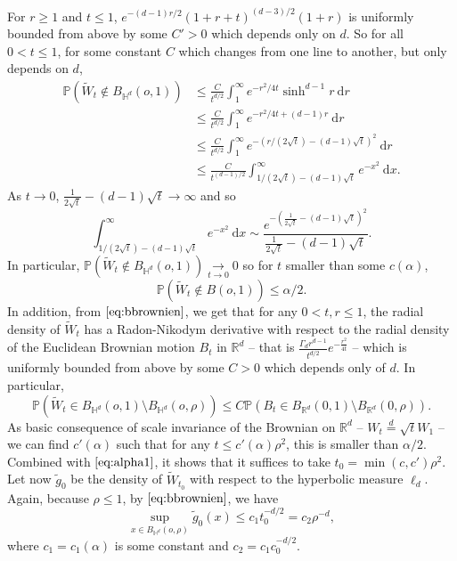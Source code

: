 \documentclass[]{scrartcl}
\newcommand{\dH}{\mathds H}
\newcommand{\R}{\mathds{R}}
\newcommand\limit[2]{\overset{#1}{\underset{#2}{\longrightarrow}}}
\newcommand{\p}{\mathbb{P}}
\renewcommand{\d}{\mathrm{d}}
\numberwithin{equation}{section}
\numberwithin{figure}{section}
\begin{document}
For $r\geq 1$ and $t \leq 1$, $e^{-(d-1)r/2}(1+r+t)^{(d-3)/2}(1+r)$ is uniformly bounded from above by some $C'>0$ which depends only on $d$. So for all $0<t\leq 1$, for some constant $C$ which changes from one line to another, but only depends on $d$, \begin{align*}
	\p(\widetilde W_t \notin B_{\dH^d}(o, 1)) &\leq \frac{C}{t^{d/2}} \int_1^\infty e^{-r^2/4t}\sinh^{d-1} r\ \d r
	\\ & \leq \frac{C}{t^{d/2}} \int_1^\infty e^{-r^2/4t + (d-1)r}\ \d r
	\\ &\leq \frac{C}{t^{d/2}} \int_1^\infty e^{-(r/(2\sqrt{t}) - (d-1)\sqrt{t})^2}\ \d r
	\\   &\leq \frac{C}{t^{(d-1)/2}} \int_{1/(2\sqrt{t}) - (d-1)\sqrt{t}}^\infty e^{-x^2}\ \d x.
\end{align*}
As $t\to 0$, $\frac{1}{2\sqrt{t}} - (d-1)\sqrt{t} \to \infty$ and so \[\int_{1/(2\sqrt{t}) - (d-1)\sqrt{t}}^\infty e^{-x^2}\ \d x \sim \frac{e^{-\left(\frac{1}{2\sqrt{t}} - (d-1)\sqrt{t}\right)^2}}{\frac{1}{2\sqrt{t}} - (d-1)\sqrt{t}}.\]
In particular, $\p(\widetilde W_t \notin B_{\dH^d}(o, 1)) \limit{}{t\to 0} 0$ so for $t$ smaller than some $c(\alpha)$, \begin{equation}\label{eq:alpha1}
	\p(\widetilde W_t \notin B(o, 1)) \leq \alpha/2.
\end{equation}
In addition, from $\eqref{eq:bbrownien}$, we get that for any $0 < t, r \leq 1$, the radial density of $\widetilde W_t$ has a Radon-Nikodym derivative with respect to the radial density of the Euclidean Brownian motion $B_t$ in $\R^d$ -- that is $\frac{\Gamma_{d} r^{d-1}}{t^{d/2}}e^{-\frac{r^2}{4t}}$ -- which is uniformly bounded from above by some $C>0$ which depends only of $d$. In particular, \[\p(\widetilde W_t \in B_{\dH^d}(o, 1)\setminus B_{\dH^d}(o, \rho)) \leq C\p(B_t \in B_{\R^d}(0, 1)\setminus B_{\R^d}(0, \rho)).\]
As basic consequence of scale invariance of the Brownian on $\R^d$ -- $W_t \stackrel{d} {=} \sqrt t W_1$ -- we can find $c'(\alpha)$ such that for any $t \leq c'(\alpha)\rho^2$, this is smaller than $\alpha/2$. Combined with $\eqref{eq:alpha1}$, it shows that it suffices to take $t_0 = \min(c, c')\rho^2$. Let now $\widetilde g_{0}$ be the density of $\widetilde W_{t_0}$ with respect to the hyperbolic measure $\ell_d$. Again, because $\rho \leq 1$, by $\eqref{eq:bbrownien}$, we have 
$$
\sup_{x \in B_{\dH^d} (o,\rho)} \widetilde g_{0} (x) \leq c_1  t_0^{-d/2} =  c_2   \rho ^{-d},
$$
where $c_1 = c_1(\alpha)$ is some constant and $c_2 = c_1 c_0^{-d/2}$.
\end{document}
